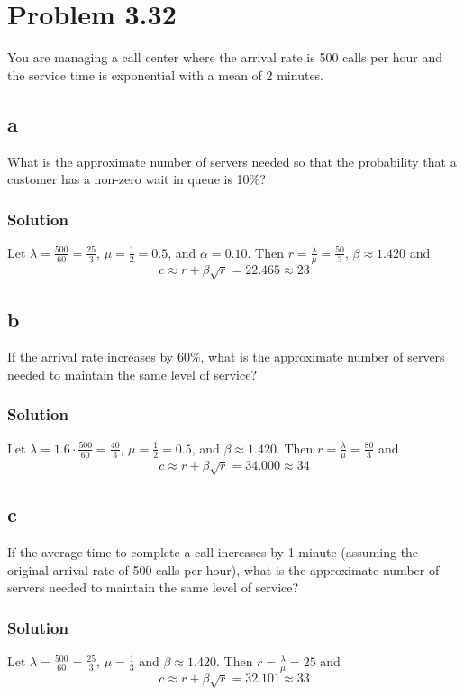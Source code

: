 \documentclass[letterpaper]{amsart}
\begin{document}
\section{Problem 3.32} %
You are managing a call center where the arrival rate is 500 calls per hour
and the service time is exponential with a mean of 2 minutes.
\subsection*{a}
What is the approximate number of servers needed so that the probability that a
customer has a non-zero wait in queue is 10\%?

\subsubsection*{Solution}
Let $\lambda = \frac{500}{60}=\frac{25}{3}$, $\mu=\frac{1}{2}=0.5$, and $\alpha=0.10$. Then
$r=\frac{\lambda}{\mu}=\frac{50}{3}$, $\beta\approx1.420$ and
\begin{equation*}
  c\approx r + \beta\sqrt{r} = 22.465 \approx 23
\end{equation*}

\subsection*{b}
If the arrival rate increases by 60\%, what is the approximate number of
servers needed to maintain the same level of service?

\subsubsection*{Solution}
Let $\lambda = 1.6\cdot\frac{500}{60}=\frac{40}{3}$, $\mu=\frac{1}{2}=0.5$,
and $\beta\approx1.420$. Then $r=\frac{\lambda}{\mu}=\frac{80}{3}$ and
\begin{equation*}
  c\approx r + \beta\sqrt{r} = 34.000 \approx 34
\end{equation*}

\subsection*{c}
If the average time to complete a call increases by 1 minute (assuming
the original arrival rate of 500 calls per hour), what is the approximate
number of servers needed to maintain the same level of service?
\subsubsection*{Solution}
Let $\lambda = \frac{500}{60}=\frac{25}{3}$, $\mu=\frac{1}{3}$
and $\beta\approx1.420$. Then $r=\frac{\lambda}{\mu}=25$ and
\begin{equation*}
  c\approx r + \beta\sqrt{r} = 32.101 \approx 33
\end{equation*}
\end{document}
